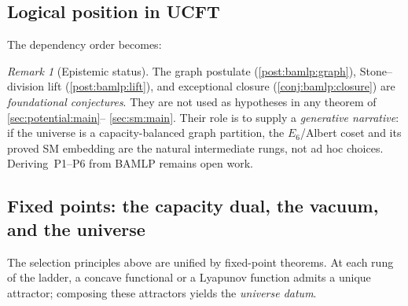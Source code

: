\documentclass[11pt]{article}
\theoremstyle{plain}
\theoremstyle{definition}
\theoremstyle{remark}
\newtheorem{remark}[theorem]{Remark}
\begin{document}
\subsection{Logical position in UCFT}
\label{sec:bamlp:position}

The dependency order becomes:
\begin{center}
\end{center}

\begin{remark}[Epistemic status]\label{rem:bamlp:status}
The graph postulate (\autoref{post:bamlp:graph}), Stone--division lift
(\autoref{post:bamlp:lift}), and exceptional closure
(\autoref{conj:bamlp:closure}) are \emph{foundational conjectures}. They are
not used as hypotheses in any theorem of \autoref{sec:potential:main}--%
\autoref{sec:sm:main}. Their role is to supply a \emph{generative narrative}:
if the universe is a capacity-balanced graph partition, the $E_6$/Albert coset
and its proved SM embedding are the natural intermediate rungs, not ad hoc
choices. Deriving~\textnormal{P1--P6} from BAMLP remains open work.
\end{remark}

\subsection{Fixed points: the capacity dual, the vacuum, and the universe}
\label{sec:bamlp:fixedpoint}

The selection principles above are unified by fixed-point theorems. At each rung
of the ladder, a concave functional or a Lyapunov function admits a unique
attractor; composing these attractors yields the \emph{universe datum}.
\end{document}
